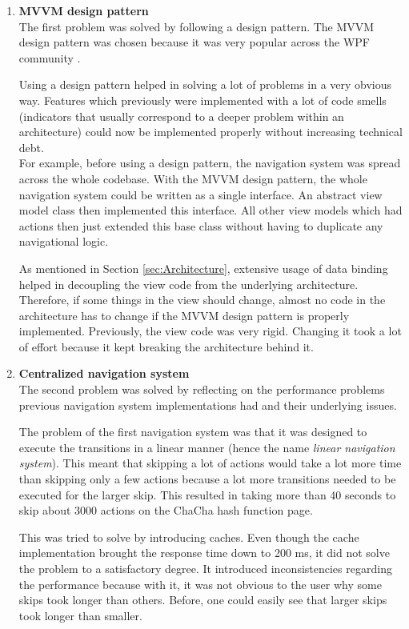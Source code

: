 \begin{enumerate}[label=(\labelenum{S}{{\arabic*}}), wide, labelwidth=!, labelindent=0pt]
\setlength{\parskip}{0pt}

\item \textbf{MVVM design pattern}\\
The first problem was solved by following a design pattern. The MVVM design pattern was chosen because it was very popular across the WPF community \cite{mvvm-wpf}. 

Using a design pattern helped in solving a lot of problems in a very obvious way. Features which previously were implemented with a lot of code smells (indicators that usually correspond to a deeper problem within an architecture) could now be implemented properly without increasing technical debt.\\
For example, before using a design pattern, the navigation system was spread across the whole codebase. With the MVVM design pattern, the whole navigation system could be written as a single interface. An abstract view model class then implemented this interface. All other view models which had actions then just extended this base class without having to duplicate any navigational logic.

As mentioned in Section \autoref{sec:Architecture}, extensive usage of data binding helped in decoupling the view code from the underlying architecture. Therefore, if some things in the view should change, almost no code in the architecture has to change if the MVVM design pattern is properly implemented. Previously, the view code was very rigid. Changing it took a lot of effort because it kept breaking the architecture behind it.

\item \textbf{Centralized navigation system}\\
The second problem was solved by reflecting on the performance problems previous navigation system implementations had and their underlying issues.

The problem of the first navigation system was that it was designed to execute the transitions in a linear manner (hence the name \textit{linear navigation system}). This meant that skipping a lot of actions would take a lot more time than skipping only a few actions because a lot more transitions needed to be executed for the larger skip. This resulted in taking more than 40 seconds to skip about 3000 actions on the ChaCha hash function page.

This was tried to solve by introducing caches. Even though the cache implementation brought the response time down to 200 ms, it did not solve the problem to a satisfactory degree. It introduced inconsistencies regarding the performance because with it, it was not obvious to the user why some skips took longer than others. Before, one could easily see that larger skips took longer than smaller.


\end{enumerate}
